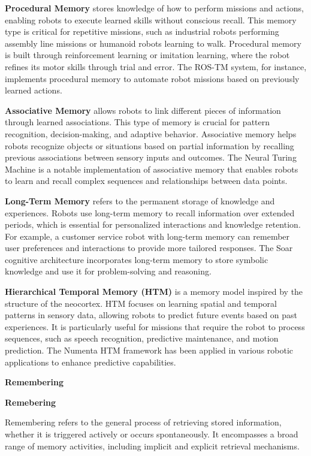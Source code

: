 \documentclass{book}
\providecommand{\ProjectDeepHeading}[2]{%
    \par\medskip\noindent\textbf{#2}\par\smallskip
}
\begin{document}
        \textbf{Procedural Memory} stores knowledge of how to perform missions and actions, enabling robots to execute learned skills without conscious recall. This memory type is critical for repetitive missions, such as industrial robots performing assembly line missions or humanoid robots learning to walk. Procedural memory is built through reinforcement learning or imitation learning, where the robot refines its motor skills through trial and error. The ROS-TM system, for instance, implements procedural memory to automate robot missions based on previously learned actions.
    
        \textbf{Associative Memory} allows robots to link different pieces of information through learned associations. This type of memory is crucial for pattern recognition, decision-making, and adaptive behavior. Associative memory helps robots recognize objects or situations based on partial information by recalling previous associations between sensory inputs and outcomes. The Neural Turing Machine is a notable implementation of associative memory that enables robots to learn and recall complex sequences and relationships between data points.
    
        \textbf{Long-Term Memory} refers to the permanent storage of knowledge and experiences. Robots use long-term memory to recall information over extended periods, which is essential for personalized interactions and knowledge retention. For example, a customer service robot with long-term memory can remember user preferences and interactions to provide more tailored responses. The Soar cognitive architecture incorporates long-term memory to store symbolic knowledge and use it for problem-solving and reasoning.
    
        \textbf{Hierarchical Temporal Memory (HTM)} is a memory model inspired by the structure of the neocortex. HTM focuses on learning spatial and temporal patterns in sensory data, allowing robots to predict future events based on past experiences. It is particularly useful for missions that require the robot to process sequences, such as speech recognition, predictive maintenance, and motion prediction. The Numenta HTM framework has been applied in various robotic applications to enhance predictive capabilities.



\ProjectDeepHeading{6}{Remembering}
    \ProjectDeepHeading{9}{Remebering}
        Remembering refers to the general process of retrieving stored information, whether it is triggered actively or occurs spontaneously. It encompasses a broad range of memory activities, including implicit and explicit retrieval mechanisms. 
        
\end{document}
